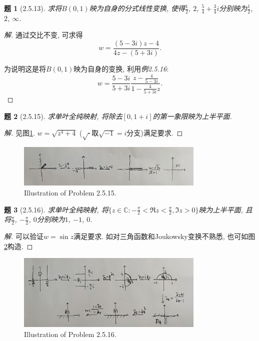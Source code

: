 \documentclass{article}[a4paper, 12pt]
\newtheorem{problem}{题}
\newenvironment{solution}{\begin{proof}[解]}{\end{proof}}
\begin{document}
\begin{problem}[2.5.13]
  求将\(B(0,1)\)映为自身的分式线性变换, 使得\(\frac12\), \(2\), \(\frac54+\frac34i\)分别映为\(\frac12\), \(2\), \(\infty\).
\end{problem}

\begin{solution}
  通过交比不变, 可求得\[w=\frac{(5-3i)z-4}{4z-(5+3i)}.\]

  为说明这是将\(B(0,1)\)映为自身的变换, 利用\emph{例2.5.16}:
  \[w=\frac{5-3i}{5+3i}\frac{z-\frac{4}{5-3i}}{1-\frac{4}{5+3i}z}.\]
\end{solution}

\begin{problem}[2.5.15]
  求单叶全纯映射, 将除去\([0,1+i]\)的第一象限映为上半平面.
\end{problem}

\begin{solution}
  见图\ref{fig:2.5.15}. \(w=\sqrt{z^4+4}\) (\(\sqrt{\cdot}\)取\(\sqrt{-1}=i\)分支)满足要求.
\end{solution}

\begin{figure}[htbp]
  \centering
  \includegraphics[width=0.8\textwidth]{images/2.5.15.jpg}
  \caption{Illustration of Problem 2.5.15.}
  \label{fig:2.5.15}
\end{figure}

\begin{problem}[2.5.16]
  求单叶全纯映射, 将\(\{z\in\mathbb{C}:-\frac\pi2<\Re z<\frac\pi2,\Im z>0\}\)映为上半平面, 且将\(\frac\pi2\), \(-\frac\pi2\), \(0\)分别映为\(1\), \(-1\), \(0\).
\end{problem}

\begin{solution}
  可以验证\(w=\sin z\)满足要求. 如对三角函数和Joukowsky变换不熟悉, 也可如图\ref{fig:2.5.16}构造.
\end{solution}

\begin{figure}[htbp]
  \centering
  \includegraphics[width=0.8\textwidth]{images/2.5.16.jpg}
  \caption{Illustration of Problem 2.5.16.}
  \label{fig:2.5.16}
\end{figure}
\end{document}
